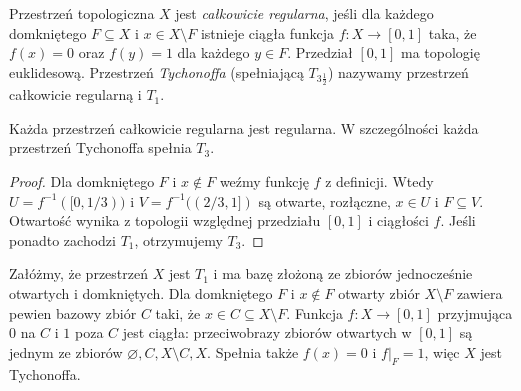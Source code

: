 \begin{definicja}
\label{def:topog-calkowita-regularnosc}
Przestrzeń topologiczna $X$ jest \emph{całkowicie regularna},
jeśli dla każdego domkniętego $F\subseteq X$ i $x\in X\setminus F$
istnieje ciągła funkcja $f\colon X\to[0,1]$ taka, że
$f(x)=0$ oraz $f(y)=1$ dla każdego $y\in F$.
Przedział $[0,1]$ ma topologię euklidesową.
Przestrzeń \emph{Tychonoffa} (spełniającą $T_{3\frac12}$)
nazywamy przestrzeń całkowicie regularną i $T_1$.
\end{definicja}

\begin{stwierdzenie}
\label{prop:topog-calkowita-regularnosc-regularna}
Każda przestrzeń całkowicie regularna jest regularna.
W szczególności każda przestrzeń Tychonoffa spełnia $T_3$.
\end{stwierdzenie}
\begin{proof}
Dla domkniętego $F$ i $x\notin F$ weźmy funkcję $f$
z definicji. Wtedy
$U=f^{-1}([0,1/3))$ i $V=f^{-1}((2/3,1])$
są otwarte, rozłączne, $x\in U$ i $F\subseteq V$.
Otwartość wynika z topologii względnej przedziału $[0,1]$
i ciągłości $f$. Jeśli ponadto zachodzi $T_1$,
otrzymujemy $T_3$.
\end{proof}

\begin{przyklad}
\label{ex:topog-zero-wymiarowy-tych}
Załóżmy, że przestrzeń $X$ jest $T_1$ i ma bazę złożoną
ze zbiorów jednocześnie otwartych i domkniętych.
Dla domkniętego $F$ i $x\notin F$ otwarty zbiór
$X\setminus F$ zawiera pewien bazowy zbiór
$C$ taki, że $x\in C\subseteq X\setminus F$.
Funkcja $f\colon X\to[0,1]$ przyjmująca $0$ na $C$
i $1$ poza $C$ jest ciągła: przeciwobrazy zbiorów
otwartych w $[0,1]$ są jednym ze zbiorów
$\varnothing,C,X\setminus C,X$. Spełnia także
$f(x)=0$ i $f|_F=1$, więc $X$ jest Tychonoffa.
\end{przyklad}


